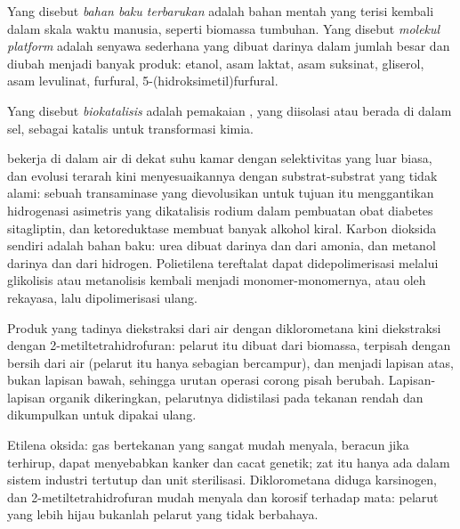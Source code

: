 \begin{definition}\label{def:b3:green-industrial:feedstock}
Yang disebut \emph{bahan baku terbarukan} adalah bahan mentah
yang terisi kembali dalam skala waktu manusia, seperti biomassa tumbuhan. Yang disebut \emph{molekul
platform} adalah senyawa sederhana yang dibuat darinya dalam jumlah
besar dan diubah menjadi banyak produk: etanol, asam laktat, asam suksinat,
gliserol, asam levulinat, furfural, 5-(hidroksimetil)furfural.
\end{definition}

\begin{definition}[Biokatalisis]\label{def:b3:green-industrial:biocatalysis}
Yang disebut \emph{biokatalisis} adalah pemakaian , yang diisolasi atau berada di dalam
sel, sebagai katalis untuk transformasi kimia.
\end{definition}

 bekerja di dalam air di dekat suhu kamar dengan selektivitas yang luar biasa, dan
evolusi terarah kini menyesuaikannya dengan substrat-substrat yang tidak alami: sebuah transaminase
yang dievolusikan untuk tujuan itu menggantikan hidrogenasi asimetris yang dikatalisis rodium
dalam pembuatan obat diabetes sitagliptin, dan ketoreduktase membuat banyak
alkohol kiral. Karbon dioksida sendiri adalah bahan baku: urea dibuat darinya dan dari
amonia, dan metanol darinya dan dari hidrogen. Polietilena tereftalat dapat
didepolimerisasi melalui glikolisis atau metanolisis kembali menjadi monomer-monomernya, atau oleh
 rekayasa, lalu dipolimerisasi ulang.

\begin{inthelab}
Produk yang tadinya diekstraksi dari air dengan diklorometana kini diekstraksi
dengan 2-metiltetrahidrofuran: pelarut itu dibuat dari biomassa, terpisah
dengan bersih dari air (pelarut itu hanya sebagian bercampur), dan menjadi lapisan atas, bukan
lapisan bawah, sehingga urutan operasi corong pisah berubah. Lapisan-lapisan
organik dikeringkan, pelarutnya didistilasi pada tekanan rendah dan
dikumpulkan untuk dipakai ulang.
\end{inthelab}

\begin{safety}{}
Etilena oksida: gas bertekanan yang sangat mudah menyala, beracun jika terhirup, dapat
menyebabkan kanker dan cacat genetik; zat itu hanya ada dalam sistem industri tertutup
dan unit sterilisasi. Diklorometana diduga karsinogen, dan
2-metiltetrahidrofuran mudah menyala dan korosif terhadap mata: pelarut yang lebih hijau
bukanlah pelarut yang tidak berbahaya.
\end{safety}

